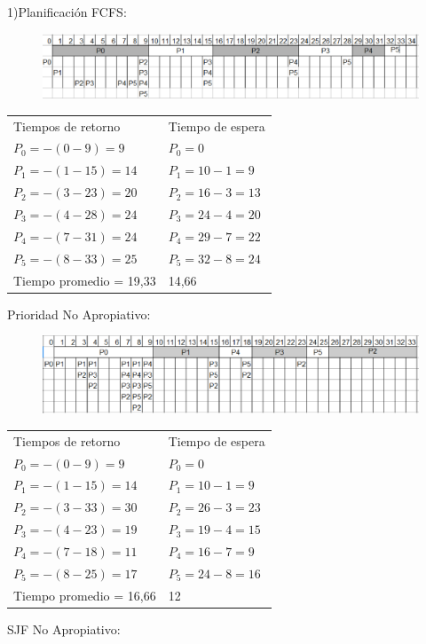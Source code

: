 \documentclass[a4paper]{article}
\begin{document}
1)Planif\mbox{}icaci\'on FCFS:\\
\begin{figure}[!htb]
\includegraphics[scale=0.60]{FCFS.eps}
\end{figure}
\begin{tabular}{l l}
Tiempos de retorno & Tiempo de espera\\
$P_0 =-(0 - 9)= 9$ & $P_0 = 0$ \\
$P_1 =-(1 - 15)= 14$ & $P_1 =10-1=9$ \\
$P_2 =-(3 - 23)= 20$ & $P_2 =16-3=13$\\
$P_3 =-(4 - 28)= 24$ & $P_3 =24-4=20$\\
$P_4 =-(7 - 31)= 24$ & $P_4 =29-7=22$\\
$P_5 =-(8 - 33)= 25$ & $P_5 =32-8=24$\\
Tiempo promedio = 19,33 & 14,66
\end{tabular}
\newline
Prioridad No Apropiativo:\\
\begin{figure}[!htb]
\includegraphics[scale=0.60]{Prioridad-noApropiativo.eps}
\end{figure}
\begin{tabular}{l l}
Tiempos de retorno & Tiempo de espera\\
$P_0 =-(0 - 9)= 9$   & $P_0 = 0$ \\
$P_1 =-(1 - 15)= 14$ & $P_1 = 10-1= 9$ \\
$P_2 =-(3 - 33)= 30$ & $P_2 = 26-3= 23$\\
$P_3 =-(4 - 23)= 19$ & $P_3 = 19-4= 15$\\
$P_4 =-(7 - 18)= 11$ & $P_4 = 16-7= 9$\\
$P_5 =-(8 - 25)= 17$ & $P_5 = 24-8= 16$\\
Tiempo promedio = 16,66 & 12
\end{tabular}
\newline
SJF No Apropiativo:\\
\end{document}
